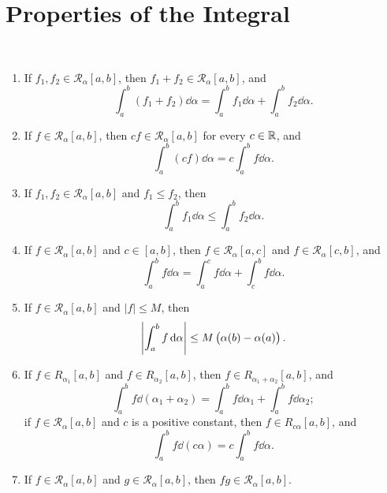 \section{Properties of the Integral}
\begin{lemma} \
\begin{enumerate}[label=(\roman*)]
\item If $f_1,f_2\in \mathcal{R}_\alpha[a,b]$, then $f_1+f_2\in \mathcal{R}_\alpha[a,b]$, and
\[\int_a^b(f_1+f_2)\dd{\alpha}=\int_a^bf_1\dd{\alpha}+\int_a^bf_2\dd{\alpha}.\]
\item If $f\in\mathcal{R}_\alpha[a,b]$, then $cf\in\mathcal{R}_\alpha[a,b]$ for every $c\in\mathbb R$, and
\[\int_a^b(cf)\dd{\alpha}=c\int_a^bf\dd{\alpha}.\]

\item If $f_1,f_2\in \mathcal{R}_\alpha[a,b]$ and $f_1\le f_2$, then
\[\int_a^bf_1\dd{\alpha}\le\int_a^bf_2\dd{\alpha}.\]

\item If $f\in \mathcal{R}_\alpha[a,b]$ and $c\in[a,b]$, then $f\in \mathcal{R}_\alpha[a,c]$ and $f\in \mathcal{R}_\alpha[c,b]$, and
\[ \int_a^b f\dd{\alpha}=\int_a^c f\dd{\alpha}+\int_c^b f\dd{\alpha}. \]

\item If $f\in \mathcal{R}_\alpha[a,b]$ and $|f|\le M$, then
\[\left|\int_a^bf\dd{\alpha}\right|\le M\left(\alpha(b)-\alpha(a)\right).\]

\item If $f\in R_{\alpha_1}[a,b]$ and $f\in R_{\alpha_2}[a,b]$, then $f\in R_{\alpha_1+\alpha_2}[a,b]$, and
\[\int_a^bf\dd{(\alpha_1+\alpha_2)}=\int_a^bf\dd{\alpha_1}+\int_a^bf\dd{\alpha_2};\]
if $f\in \mathcal{R}_\alpha[a,b]$ and $c$ is a positive constant, then $f\in R_{c\alpha}[a,b]$, and
\[\int_a^bf\dd{(c\alpha)}=c\int_a^bf\dd{\alpha}.\]

\item If $f\in \mathcal{R}_\alpha[a,b]$ and $g\in \mathcal{R}_\alpha[a,b]$, then $fg\in \mathcal{R}_\alpha[a,b]$.
\end{enumerate}
\end{lemma}

